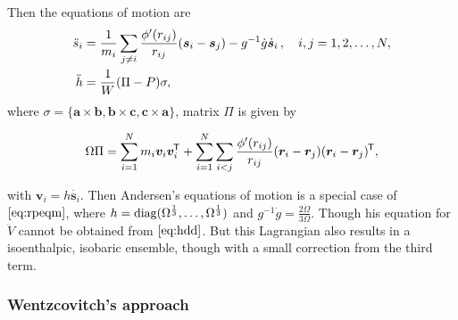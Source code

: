 Then the equations of motion are
\begin{subequations}
	\label{eq:rpeqm}
	\begin{align}
		\ddot{s}_i & = \frac{ 1 }{ m_i } \sum_{j\neq i}
		\frac{ \phi'(r_{ij}) }{ r_{ij} } (\bm{s}_i - \bm{s}_j) - g^{-1}\dot{g}
		\dot{ \bm{s} }_i \thinspace, \quad i, j = 1, 2, \ldots, N,\label{eq:rpsdd} \\
		\ddot{h}   & = \frac{ 1 }{ W } (\Pi - P) \sigma, \label{eq:hdd}
	\end{align}
\end{subequations}
where $\sigma = \{\bm{a}\times \bm{b},
	\bm{b}\times \bm{c}, \bm{c}\times \bm{a}\}$,
matrix $\Pi$ is given by

\begin{equation}\label{eq:pim&frr}
	\Omega \Pi = \sum_{i=1}^{N} m_i \bm{v}_i \bm{v}_i^{\mkern-1.5mu\mathsf{T}}
	+ \sum_{i=1}^{N} \sum_{i<j} \frac{ \phi'(r_{ij}) }{ r_{ij} }
	(\bm{r}_i - \bm{r}_j) (\bm{r}_i - \bm{r}_j)^{\mkern-1.5mu\mathsf{T}},
\end{equation}

with $\bm{v}_i = h \dot{ \bm{s}_i }$.
Then Andersen's equations of motion is a special case of
$\eqref{eq:rpeqm}$,
where $h = \operatorname{diag} (\Omega^{\frac{ 1 }{ 3 }}, \ldots,
	\Omega^{\frac{ 1 }{ 3 }})$ and $g^{-1} \dot{g} =
	\frac{ 2 \dot{\Omega} }{3 \Omega }$. Though his equation for
$\ddot{V}$ cannot be obtained from $\eqref{eq:hdd}$. But
this Lagrangian also results in a isoenthalpic, isobaric ensemble,
though with a small correction from the third term.


\subsubsection{Wentzcovitch's approach}

